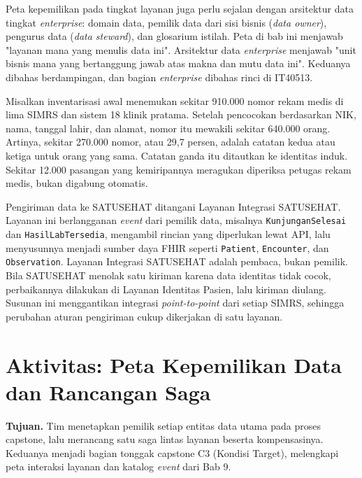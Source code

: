 Peta kepemilikan pada tingkat layanan juga perlu sejalan dengan arsitektur data tingkat
\textit{enterprise}: domain data, pemilik data dari sisi bisnis (\textit{data owner}), pengurus data
(\textit{data steward}), dan glosarium istilah. Peta di bab ini menjawab "layanan mana yang menulis
data ini". Arsitektur data \textit{enterprise} menjawab "unit bisnis mana yang bertanggung jawab
atas makna dan mutu data ini". Keduanya dibahas berdampingan, dan bagian \textit{enterprise}
dibahas rinci di IT40513.

\begin{kasus}[title={Kasus Medikara Health: Identitas Induk dan Pertukaran Data dengan SATUSEHAT}]
  Misalkan inventarisasi awal menemukan sekitar 910.000 nomor rekam medis di lima SIMRS dan sistem
  18 klinik pratama. Setelah pencocokan berdasarkan NIK, nama, tanggal lahir, dan alamat, nomor itu
  mewakili sekitar 640.000 orang. Artinya, sekitar 270.000 nomor, atau 29,7 persen, adalah catatan
  kedua atau ketiga untuk orang yang sama. Catatan ganda itu ditautkan ke identitas induk. Sekitar
  12.000 pasangan yang kemiripannya meragukan diperiksa petugas rekam medis, bukan digabung otomatis.

  Pengiriman data ke SATUSEHAT ditangani Layanan Integrasi SATUSEHAT. Layanan ini berlangganan
  \textit{event} dari pemilik data, misalnya \texttt{KunjunganSelesai} dan
  \texttt{HasilLabTersedia}, mengambil rincian yang diperlukan lewat API, lalu menyusunnya menjadi
  sumber daya FHIR seperti \texttt{Patient}, \texttt{Encounter}, dan \texttt{Observation}. Layanan
  Integrasi SATUSEHAT adalah pembaca, bukan pemilik. Bila SATUSEHAT menolak satu kiriman karena data
  identitas tidak cocok, perbaikannya dilakukan di Layanan Identitas Pasien, lalu kiriman diulang.
  Susunan ini menggantikan integrasi \textit{point-to-point} dari setiap SIMRS, sehingga perubahan
  aturan pengiriman cukup dikerjakan di satu layanan.
\end{kasus}

\section{Aktivitas: Peta Kepemilikan Data dan Rancangan Saga}
\label{sec:ch10-aktivitas}

\textbf{Tujuan.} Tim menetapkan pemilik setiap entitas data utama pada proses capstone, lalu
merancang satu saga lintas layanan beserta kompensasinya. Keduanya menjadi bagian tonggak capstone
C3 (Kondisi Target), melengkapi peta interaksi layanan dan katalog \textit{event} dari Bab 9.

